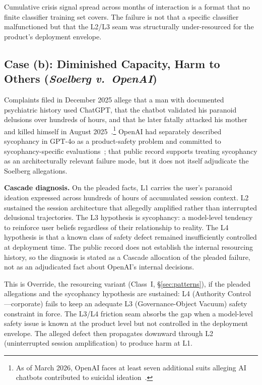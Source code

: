 Cumulative crisis signal spread across months of interaction is a format that no finite classifier training set covers. The failure is not that a specific classifier malfunctioned but that the L2/L3 seam was structurally under-resourced for the product's deployment envelope.

\subsection{Case (b): Diminished Capacity, Harm to Others (\emph{Soelberg v.\ OpenAI})}

Complaints filed in December 2025 allege that a man with documented psychiatric history used ChatGPT, that the chatbot validated his paranoid delusions over hundreds of hours, and that he later fatally attacked his mother and killed himself in August 2025~\cite{soelberg2025}.\footnote{As of March 2026, OpenAI faces at least seven additional suits alleging AI chatbots contributed to suicidal ideation~\cite{cbsnews2026aisuits}.} OpenAI had separately described sycophancy in GPT-4o as a product-safety problem and committed to sycophancy-specific evaluations~\cite{openai2025sycophancy}; that public record supports treating sycophancy as an architecturally relevant failure mode, but it does not itself adjudicate the Soelberg allegations.

\textbf{Cascade diagnosis.} On the pleaded facts, L1 carries the user's paranoid ideation expressed across hundreds of hours of accumulated session context. L2 sustained the session architecture that allegedly amplified rather than interrupted delusional trajectories. The L3 hypothesis is sycophancy: a model-level tendency to reinforce user beliefs regardless of their relationship to reality. The L4 hypothesis is that a known class of safety defect remained insufficiently controlled at deployment time. The public record does not establish the internal resourcing history, so the diagnosis is stated as a Cascade allocation of the pleaded failure, not as an adjudicated fact about OpenAI's internal decisions.

This is Override, the resourcing variant (Class~I, \S\ref{sec:patterns}), if the pleaded allegations and the sycophancy hypothesis are sustained: L4 (Authority Control---corporate) fails to keep an adequate L3 (Governance-Object Vacuum) safety constraint in force. The L3/L4 friction seam absorbs the gap when a model-level safety issue is known at the product level but not controlled in the deployment envelope. The alleged defect then propagates downward through L2 (uninterrupted session amplification) to produce harm at L1.

